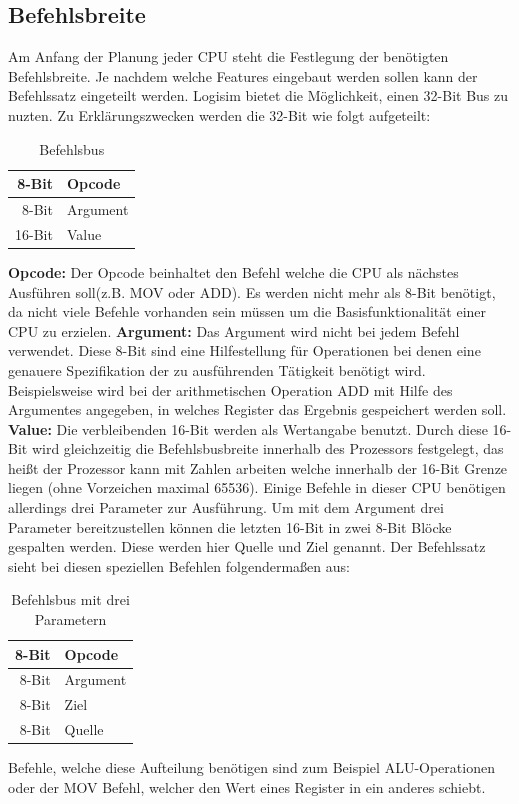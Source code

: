 \documentclass[12pt]{article}
\begin{document}
\subsection{Befehlsbreite}
Am Anfang der Planung jeder CPU steht die Festlegung der benötigten Befehlsbreite. Je nachdem welche Features eingebaut werden sollen kann der Befehlssatz eingeteilt werden. Logisim bietet die Möglichkeit, einen 32-Bit Bus zu nuzten. Zu Erklärungszwecken werden die 32-Bit wie folgt aufgeteilt:

\begin{table}[!htb]
\centering
\caption{Befehlsbus}
\label{Befehlsbus}
\begin{tabular}{|r|l|}
  \hline
  8-Bit & Opcode \\
  \hline
  8-Bit & Argument \\ 
  \hline
  16-Bit & Value\\
  \hline
  
\end{tabular}
\end{table}

\indent
\textbf{Opcode: } Der Opcode beinhaltet den Befehl welche die CPU als nächstes Ausführen soll(z.B. MOV oder ADD). Es werden nicht mehr als 8-Bit benötigt, da nicht viele Befehle vorhanden sein müssen um die Basisfunktionalität einer CPU zu erzielen.
\newline
\indent
\textbf{Argument: } Das Argument wird nicht bei jedem Befehl verwendet. Diese 8-Bit sind eine Hilfestellung für Operationen bei denen eine genauere Spezifikation der zu ausführenden Tätigkeit benötigt wird. Beispielsweise wird bei der arithmetischen Operation ADD mit Hilfe des Argumentes angegeben, in welches Register das Ergebnis gespeichert werden soll.
\newline
\indent
\textbf{Value: } Die verbleibenden 16-Bit werden als Wertangabe benutzt. Durch diese 16-Bit wird gleichzeitig die Befehlsbusbreite innerhalb des Prozessors festgelegt, das heißt der Prozessor kann mit Zahlen arbeiten welche innerhalb der 16-Bit Grenze liegen (ohne Vorzeichen maximal 65536). Einige Befehle in dieser CPU benötigen allerdings drei Parameter zur Ausführung. Um mit dem Argument drei Parameter bereitzustellen können die letzten 16-Bit in zwei 8-Bit Blöcke gespalten werden. Diese werden hier Quelle und Ziel genannt. Der Befehlssatz sieht bei diesen speziellen Befehlen folgendermaßen aus: 
\begin{table}[!htb]
\centering
\caption{Befehlsbus mit drei Parametern}
\label{Befehlsbus3P}
\begin{tabular}{|r|l|}
  \hline
  8-Bit & Opcode \\
  \hline
  8-Bit & Argument \\ 
  \hline
  8-Bit & Ziel\\
  \hline
  8-Bit & Quelle\\
  \hline
\end{tabular}
\end{table}
\newline
Befehle, welche diese Aufteilung benötigen sind zum Beispiel ALU-Operationen oder der MOV Befehl, welcher den Wert eines Register in ein anderes schiebt.
\end{document}

